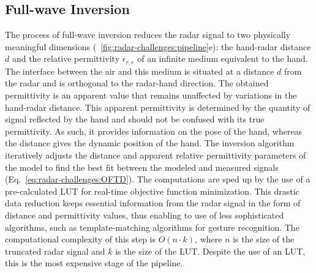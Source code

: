 \subsection{Full-wave Inversion}\label{sec:radar-challenges:processing-strategy:inversion}
The process of full-wave inversion reduces the radar signal to two physically meaningful dimensions (\fig~\ref{fig:radar-challenges:pipeline}e): the hand-radar distance $d$ and the relative permittivity $\epsilon_{r,e}$ of an infinite medium equivalent to the hand. The interface between the air and this medium is situated at a distance $d$ from the radar and is orthogonal to the radar-hand direction. 
The obtained permittivity is an apparent value that remains unaffected by variations in the hand-radar distance. This apparent permittivity is determined by the quantity of signal reflected by the hand and should not be confused with its true permittivity. As such, it provides information on the pose of the hand, whereas the distance gives the dynamic position of the hand.
The inversion algorithm iteratively adjusts the distance and apparent relative permittivity parameters of the model to find the best fit between the modeled and measured signals (Eq.~\ref{eq:radar-challenges:OFTD}). The computations are sped up by the use of a pre-calculated LUT for real-time objective function minimization. 
This drastic data reduction keeps essential information from the radar signal in the form of distance and permittivity values, thus enabling to use of less sophisticated algorithms, such as template-matching algorithms for gesture recognition.
%
The computational complexity of this step is $O(n \cdot k)$, where $n$ is the size of the truncated radar signal and $k$ is the size of the LUT. Despite the use of an LUT, this is the most expensive stage of the pipeline.

